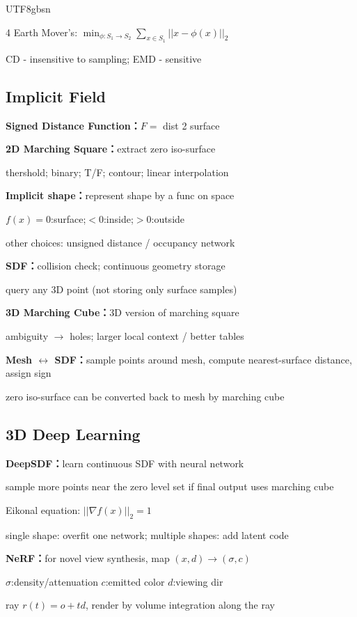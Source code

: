 \documentclass[8pt,a4paper]{extarticle}
\newcommand{\entry}[1]{\vspace{3pt}\noindent\textbf{#1：}}
\begin{document}
\begin{CJK*}{UTF8}{gbsn}
\begin{multicols*}{4}
Earth Mover's: $\displaystyle\min_{\phi: S_1 \to S_2} \displaystyle\sum_{x \in S_1} ||x-\phi(x)||_2$

CD - insensitive to sampling; EMD - sensitive

\subsection*{Implicit Field}

\entry{Signed Distance Function}$F = $ dist 2 surface

\entry{2D Marching Square}extract zero iso-surface

thershold; binary; T/F; contour; linear interpolation

\entry{Implicit shape}represent shape by a func on space

$f(x)=0$:surface;$<0$:inside;$>0$:outside

other choices: unsigned distance / occupancy network

\entry{SDF}collision check; continuous geometry storage

query any 3D point (not storing only surface samples)

\entry{3D Marching Cube}3D version of marching square

ambiguity $\rightarrow$ holes; larger local context / better tables

\entry{Mesh $\leftrightarrow$ SDF}sample points around mesh, compute nearest-surface distance, assign sign

zero iso-surface can be converted back to mesh by marching cube

\subsection*{3D Deep Learning}

\entry{DeepSDF}learn continuous SDF with neural network

sample more points near the zero level set if final output uses marching cube

Eikonal equation: $||\nabla f(x)||_2 = 1$

single shape: overfit one network; multiple shapes: add latent code

\entry{NeRF}for novel view synthesis, map $(x,d)\rightarrow (\sigma,c)$

$\sigma$:density/attenuation $c$:emitted color $d$:viewing dir

ray $r(t)=o+td$, render by volume integration along the ray


\end{multicols*}
\end{CJK*}
\end{document}
